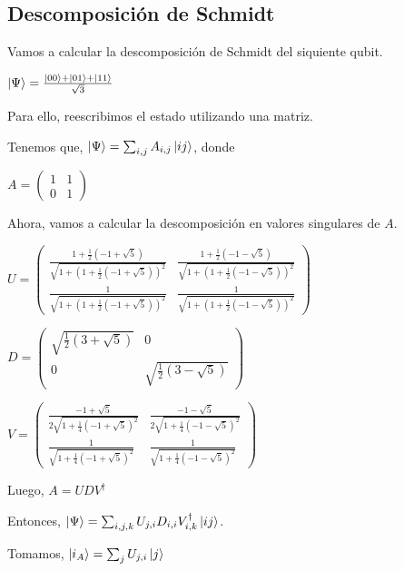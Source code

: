\documentclass[a4paper,11pt]{article}
\begin{document}
\subsection*{Descomposición de Schmidt}

Vamos a calcular la descomposición de Schmidt del siquiente qubit.

$\left\vert{\Psi}\right\rangle = \frac{\left\vert{00}\right\rangle + \left\vert{01}\right\rangle + \left\vert{11}\right\rangle}{\sqrt{3}}$

Para ello, reescribimos el estado utilizando una matriz.

Tenemos que, $\left\vert{\Psi}\right\rangle = \sum_{i,j} A_{i,j} \left\vert{ij}\right\rangle$, donde

$A = 
\begin{pmatrix}
1 & 1\\ 
0 & 1
\end{pmatrix}
$

Ahora, vamos a calcular la descomposición en valores singulares de $A$.

$
U =
\begin{pmatrix}
\frac{1+\frac{1}{2}\left ( -1 + \sqrt{5} \right )}{\sqrt{1 + \left ( 1 +\frac{1}{2} 
\left ( -1 + \sqrt{5} \right ) \right )^2}} 
& \frac{1+\frac{1}{2}\left ( -1 - \sqrt{5} \right )}{\sqrt{1 + \left ( 1 +\frac{1}{2} 
\left ( -1 - \sqrt{5} \right ) \right )^2}} 
\\ 
\frac{1}{\sqrt{1 + \left ( 1 +\frac{1}{2} 
\left ( -1 + \sqrt{5} \right ) \right )^2}} 
 
& \frac{1}{\sqrt{1 + \left ( 1 +\frac{1}{2} 
\left ( -1 - \sqrt{5} \right ) \right )^2}} 
\end{pmatrix}
$

$
D =
\begin{pmatrix}
\sqrt{\frac{1}{2}\left ( 3 + \sqrt{5} \right )}
& 0
\\ 
0
& \sqrt{\frac{1}{2}\left ( 3 - \sqrt{5} \right )}
\end{pmatrix}
$

$V = 
\begin{pmatrix}
\frac{-1 + \sqrt{5}}{2\sqrt{1 + \frac{1}{4}\left ( -1 + \sqrt{5}\right )^2}} 
& \frac{-1 - \sqrt{5}}{2\sqrt{1 + \frac{1}{4}\left ( -1 - \sqrt{5}\right )^2}} 
\\ 
\frac{1}{\sqrt{1 + \frac{1}{4}\left ( -1 + \sqrt{5}\right )^2}} 
& \frac{1}{\sqrt{1 + \frac{1}{4}\left ( -1 - \sqrt{5}\right )^2}} 
\end{pmatrix}$

Luego, $A = U D V^{\dag}$

Entonces, $\left\vert{\Psi}\right\rangle = \sum_{i,j,k} U_{j,i} D_{i,i} V^{\dag}_{i,k}\left\vert{ij}\right\rangle$.

Tomamos, $\left\vert{i_A}\right\rangle = \sum_{j} U_{j,i}\left\vert{j}\right\rangle$
\end{document}

